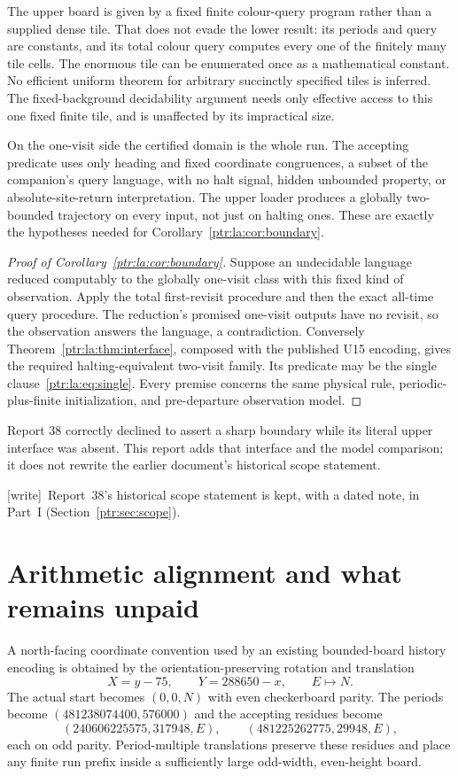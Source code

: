 \documentclass[11pt,letterpaper]{article}
\theoremstyle{definition}\newtheorem{definition}[theorem]{Definition}
\theoremstyle{remark}\newtheorem{remark}[theorem]{Remark}
\newcommand{\wtag}{\textup{[write]}}
\begin{document}
The upper board is given by a fixed finite colour-query program rather than a supplied dense tile. That does not evade the lower result: its periods and query are constants, and its total colour query computes every one of the finitely many tile cells. The enormous tile can be enumerated once as a mathematical constant. No efficient uniform theorem for arbitrary succinctly specified tiles is inferred. The fixed-background decidability argument needs only effective access to this one fixed finite tile, and is unaffected by its impractical size.

On the one-visit side the certified domain is the whole run. The accepting predicate uses only heading and fixed coordinate congruences, a subset of the companion's query language, with no halt signal, hidden unbounded property, or absolute-site-return interpretation. The upper loader produces a globally two-bounded trajectory on every input, not just on halting ones. These are exactly the hypotheses needed for Corollary~\ref{ptr:la:cor:boundary}.

\begin{proof}[Proof of Corollary~\ref{ptr:la:cor:boundary}]
Suppose an undecidable language reduced computably to the globally one-visit class with this fixed kind of observation. Apply the total first-revisit procedure and then the exact all-time query procedure. The reduction's promised one-visit outputs have no revisit, so the observation answers the language, a contradiction. Conversely Theorem~\ref{ptr:la:thm:interface}, composed with the published U15 encoding, gives the required halting-equivalent two-visit family. Its predicate may be the single clause~\eqref{ptr:la:eq:single}. Every premise concerns the same physical rule, periodic-plus-finite initialization, and pre-departure observation model.
\end{proof}
Report 38 correctly declined to assert a sharp boundary while its literal upper interface was absent. This report adds that interface and the model comparison; it does not rewrite the earlier document's historical scope statement.

{\small\wtag\ Report~38's historical scope statement is kept, with a dated
note, in Part~I (Section~\ref{ptr:sec:scope}).\par}

\section{Arithmetic alignment and what remains unpaid}\label{ptr:la:sec:arithmetic}
A north-facing coordinate convention used by an existing bounded-board history encoding is obtained by the orientation-preserving rotation and translation
\[
 X=y-75,\qquad Y=288650-x,\qquad E\mapsto N.
\]
The actual start becomes $(0,0,N)$ with even checkerboard parity. The periods become $(481238074400,576000)$ and the accepting residues become
\[
(240606225575,317948,E),\qquad(481225262775,29948,E),
\]
each on odd parity. Period-multiple translations preserve these residues and place any finite run prefix inside a sufficiently large odd-width, even-height board.
\end{document}
